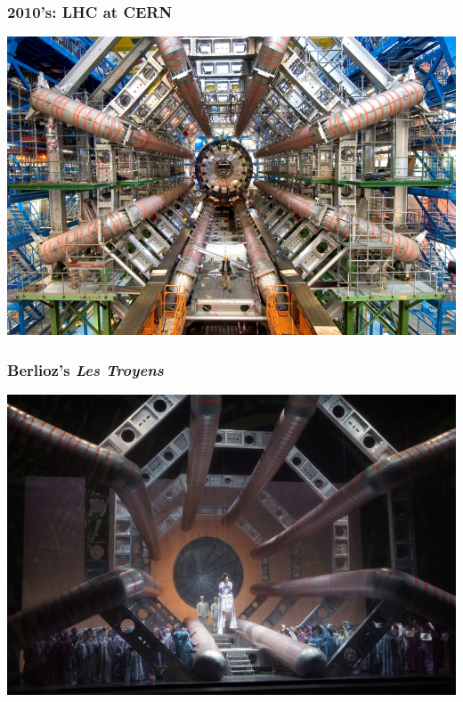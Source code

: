 \documentclass[compress]{beamer}
\begin{document}
\begin{frame}
\frametitle{2010's: LHC at CERN}
\includegraphics[width=\linewidth]{atlas.jpg}
\end{frame}

\begin{frame}
\frametitle{Berlioz's {\it Les Troyens}}
\includegraphics[width=\linewidth]{berlioz_troyens.jpg}
\end{frame}
\end{document}
